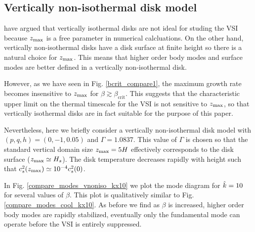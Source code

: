 \subsection{Vertically non-isothermal disk model} 
 have argued that vertically isothermal disks are not
ideal for studing the VSI because $z_\mathrm{max}$ is a free 
parameter in numerical calcluations. On the other hand, vertically 
non-isothermal disks have a disk surface at finite height so there is
a natural choice for $z_\mathrm{max}$. This means that higher order body modes and
surface modes are better defined in a vertically non-isothermal disk.   

However, as we have seen in Fig. \ref{bcrit_compare1}, the maximum
growth rate becomes insensitive to $z_\mathrm{max}$ for $\beta\gtrsim
\beta_\mathrm{crit}$. This suggests that the characteristic upper
limit on the thermal timescale for the VSI is not sensitive to
$z_\mathrm{max}$, so that vertically isothermal disks are in fact suitable for
the purpose of this paper. 


Nevertheless, here we briefly consider a vertically non-isothermal
disk model with $(p,q, h)=(0,-1,0.05)$ and $\Gamma=1.0837$. This
value of $\Gamma$ is chosen so that the standard vertical domain size $z_\mathrm{max} =
5H$ effectively corresponds to the disk surface ($z_\mathrm{max}\simeq
H_s$). The disk temperature decreases rapidly with height such that 
$c_s^2(z_\mathrm{max})\simeq 10^{-4}c_s^2(0)$.    

In Fig. \ref{compare_modes_vnoniso_kx10} we plot the mode diagram for
$\hat{k}=10$ for several values of $\beta$. This plot is 
qualitatively similar to Fig. \ref{compare_modes_cool_kx10}. As before
we find as $\beta$ is increased, higher order body modes are rapidly
stabilized, eventually only the fundamental mode can operate before
the VSI is entirely suppressed.  

